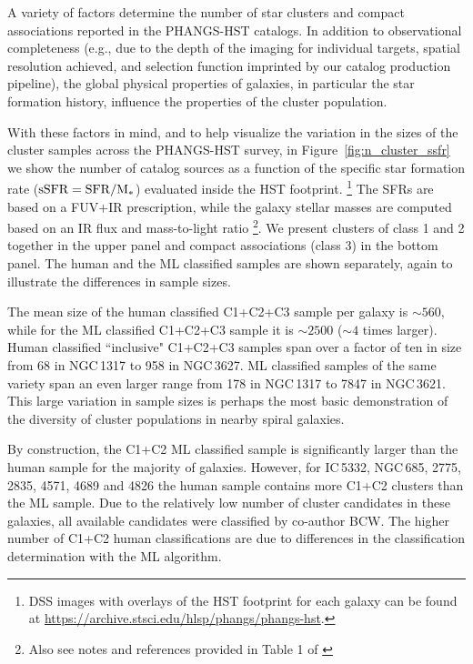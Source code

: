 \documentclass[linenumbers]{aastex63}
\begin{document}
A variety of factors determine the number of star clusters and compact associations reported in the PHANGS-HST catalogs.
In addition to observational completeness (e.g., due to the depth of the imaging for individual targets, spatial resolution achieved, and selection function imprinted by our catalog production pipeline), the global physical properties of galaxies, in particular the star formation history, influence the properties of the cluster population. 



With these factors in mind, and to help visualize the variation in the sizes of the cluster samples across the PHANGS-HST survey, in Figure~\ref{fig:n_cluster_ssfr} we show the number of catalog sources as a function of the specific star formation rate (${\rm sSFR = SFR / M_{*}}$) evaluated inside the HST footprint. \footnote{DSS images with overlays of the HST footprint for each galaxy can be found at \url{https://archive.stsci.edu/hlsp/phangs/phangs-hst}.}  
The SFRs are based on a FUV$+$IR prescription, while the galaxy stellar masses are computed based on an IR flux and mass-to-light ratio \citep{leroy_z_2019,leroy_phangs-alma_2021}\footnote{Also see notes and references provided in Table 1 of \citet{lee_phangs-hst_2022}}.  We present clusters of class 1 and 2 together in the upper panel and compact associations (class 3) in the bottom panel.  
The human and the ML classified samples are shown separately, again to illustrate the differences in sample sizes. 


The mean size of the human classified C1+C2+C3 sample per galaxy is $\sim560$, while for the ML classified C1+C2+C3 sample it is $\sim2500$ ($\sim4$ times larger).  Human classified ``inclusive" C1+C2+C3 samples span over a factor of ten in size from 68 in NGC\,1317 to 958 in NGC\,3627.  ML classified samples of the same variety span an even larger range from  178 in NGC\,1317 to 7847 in NGC\,3621.  This large variation in sample sizes is perhaps the most basic demonstration of the diversity of cluster populations in nearby spiral galaxies.



By construction, the C1+C2 ML classified sample is significantly larger than the human sample for the majority of galaxies. 
However, for IC\,5332, NGC\,685, 2775, 2835, 4571, 4689 and 4826 the human sample contains more C1+C2 clusters than the ML sample. Due to the relatively low number of cluster candidates in these galaxies, all available candidates were classified by co-author BCW. The higher number of C1+C2 human classifications are due to differences in the classification determination with the ML algorithm.
\end{document}
